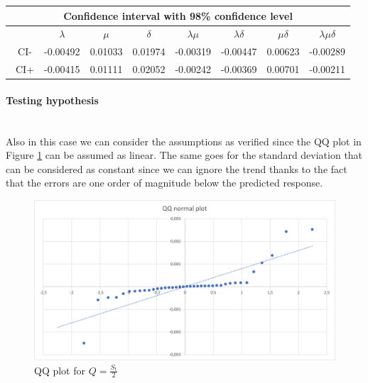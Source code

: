 \documentclass{article}
\begin{document}
                    \begin{table}[htbp]
                        \begin{tabular}{|c|c|c|c|c|c|c|c|}
                        
                            \hline
                            \multicolumn{8}{|c|}{\bf Confidence interval with 98\% confidence level} \\
                                
                            \hline
                            \ & $\lambda$ & $\mu$ & $\delta$ & $\lambda\mu$ & $\lambda\delta$ & $\mu\delta$ & $\lambda\mu\delta$\\
                            \hline
                            \ CI- & -0.00492 & 0.01033 & 0.01974 & -0.00319 & -0.00447 & 0.00623 & -0.00289 \\ 
                            \hline
                            \ CI+ & -0.00415 & 0.01111 & 0.02052 & -0.00242 & -0.00369 & 0.00701 & -0.00211 \\ 
                            \hline
                        \end{tabular}
                        \label{table:CI_0,5}
                    \end{table}
                    
                \paragraph{Testing hypothesis} \hfill \\
                Also in this case we can consider the assumptions as verified since the QQ plot in Figure \ref{fig:QQplot_0,5} can be assumed as linear.
                The same goes for the standard deviation that can be considered as constant since we can ignore the trend thanks to the fact that the errors are one order of magnitude below the predicted response.
                
                    \begin{figure}[htbp]
                        \centering
                        \includegraphics[scale=0.6]{images/QQplot_0,5.png}
                        \caption{QQ plot for $Q = \frac{S_t}{2}$}
                        \label{fig:QQplot_0,5}
                    \end{figure}
                    
\end{document}
